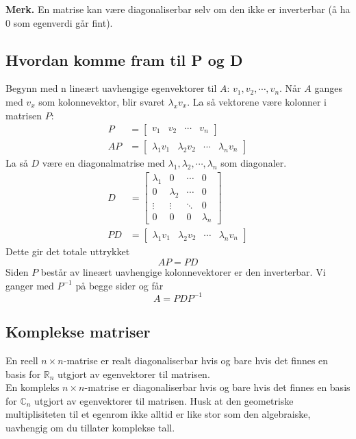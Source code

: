 \documentclass[12pt,a4paper,norsk]{article}
\newcommand{\R}{\mathbb{R}}
\newcommand{\C}{\mathbb{C}}
\begin{document}
\textbf{Merk.} En matrise kan være diagonaliserbar selv om den ikke er
inverterbar (å ha 0 som egenverdi går fint).

\subsection{Hvordan komme fram til P og D}
Begynn med n lineært uavhengige egenvektorer til $A$: $v_{1}, v_{2}, \cdots, v_{n}$.
Når $A$ ganges med $v_{x}$ som kolonnevektor, blir svaret $\lambda_{x} v_{x}$. La så
vektorene være kolonner i matrisen $P$:
\begin{align*}
  P &= \begin{bmatrix}
    v_{1} & v_{2} & \cdots & v_{n}
  \end{bmatrix} \\
  AP &= \begin{bmatrix}
    \lambda_{1}v_{1} & \lambda_{2}v_{2} & \cdots & \lambda_{n}v_{n}
  \end{bmatrix}
\end{align*}
La så $D$ være en diagonalmatrise med $\lambda_{1}, \lambda_{2}, \cdots, \lambda_{n}$ som diagonaler.
\begin{align*}
  D &= \begin{bmatrix}
    \lambda_{1} & 0 & \cdots & 0 \\
    0 & \lambda_{2} & \cdots & 0 \\
    \vdots & \vdots & \ddots & 0 \\
    0 & 0 & 0 & \lambda_{n}
  \end{bmatrix} \\
  PD &= \begin{bmatrix}
    \lambda_{1}v_{1} & \lambda_{2}v_{2} & \cdots & \lambda_{n}v_{n}
  \end{bmatrix}
\end{align*}
Dette gir det totale uttrykket
\[AP = PD\]
Siden $P$ består av lineært uavhengige kolonnevektorer er den inverterbar. Vi
ganger med $P^{-1}$ på begge sider og får
\[A = PDP^{-1}\]

\subsection{Komplekse matriser}
En reell $n \times n$-matrise er realt diagonaliserbar hvis og bare hvis det finnes
en basis for $\R_{n}$ utgjort av egenvektorer til matrisen. \\
En kompleks $n \times n$-matrise er diagonaliserbar hvis og bare hvis det finnes en
basis for $\C_{n}$ utgjort av egenvektorer til matrisen. Husk at den geometriske
multiplisiteten til et egenrom ikke alltid er like stor som den algebraiske,
uavhengig om du tillater komplekse tall.
\end{document}
